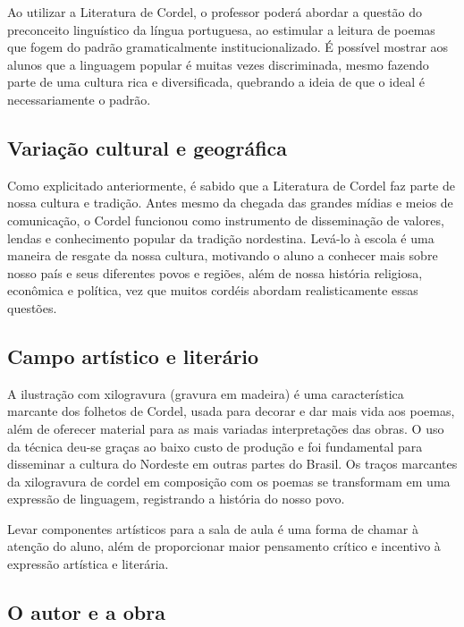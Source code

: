 \documentclass[12pt]{extarticle}
\begin{document}
Ao utilizar a Literatura de Cordel, o professor poderá abordar a questão
do preconceito linguístico da língua portuguesa, ao estimular a leitura
de poemas que fogem do padrão gramaticalmente institucionalizado. É
possível mostrar aos alunos que a linguagem popular é muitas vezes
discriminada, mesmo fazendo parte de uma cultura rica e diversificada,
quebrando a ideia de que o ideal é necessariamente o padrão.

\subsection{Variação cultural e geográfica}

Como explicitado anteriormente, é sabido que a Literatura de Cordel faz
parte de nossa cultura e tradição. Antes mesmo da chegada das grandes
mídias e meios de comunicação, o Cordel funcionou como instrumento de
disseminação de valores, lendas e conhecimento popular da tradição
nordestina. Levá-lo à escola é uma maneira de resgate da nossa cultura,
motivando o aluno a conhecer mais sobre nosso país e seus diferentes
povos e regiões, além de nossa história religiosa, econômica e política,
vez que muitos cordéis abordam realisticamente essas questões.

\subsection{Campo artístico e literário}

A ilustração com xilogravura (gravura em madeira) é uma característica
marcante dos folhetos de Cordel, usada para decorar e dar mais vida aos
poemas, além de oferecer material para as mais variadas interpretações
das obras. O uso da técnica deu-se graças ao baixo custo de produção e
foi fundamental para disseminar a cultura do Nordeste em outras partes
do Brasil. Os traços marcantes da xilogravura de cordel em composição
com os poemas se transformam em uma expressão de linguagem, registrando
a história do nosso povo.

Levar componentes artísticos para a sala de aula é uma forma de chamar à
atenção do aluno, além de proporcionar maior pensamento crítico e
incentivo à expressão artística e literária.


\subsection{O autor e a obra}
\end{document}
